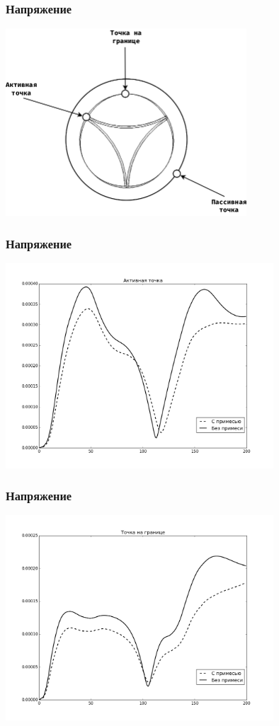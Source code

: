 \documentclass[14pt]{beamer}
\begin{document}
\begin{frame}
\frametitle{Напряжение}
    \begin{center}
        \includegraphics[width=9cm]{valve_points.png}
    \end{center}
\end{frame}

\begin{frame}
\frametitle{Напряжение}
    \begin{center}
        \includegraphics[width=10cm]{forces_active_point.png}
    \end{center}
\end{frame}

\begin{frame}
\frametitle{Напряжение}
    \begin{center}
        \includegraphics[width=10cm]{forces_boundary_point.png}
    \end{center}
\end{frame}
\end{document}
